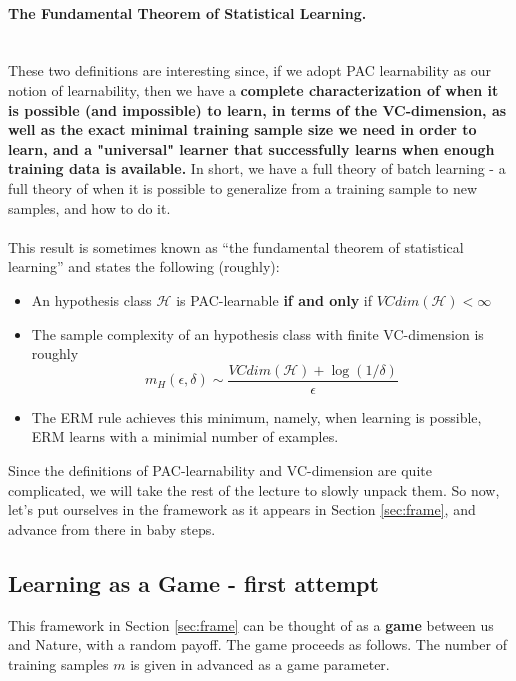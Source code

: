 \documentclass[11pt]{article}
\newcommand{\Hc}{\mathcal{H}}
\begin{document}
{\paragraph{The Fundamental Theorem of Statistical Learning.}
~\\
These two definitions are interesting since, if we adopt PAC learnability as our
notion of learnability, then we have a {\bf complete characterization of when it
is possible (and impossible) to learn, in terms of the VC-dimension, as well as  the exact minimal  training sample size we need in order to learn, and a "universal" learner that successfully learns when enough training data is available. } In short, we have a full theory of batch learning - a full theory of when it is possible to generalize from a training sample to new samples, and how to do it.
\\~\\
This result is sometimes known as ``the fundamental theorem of statistical
learning'' and states the following (roughly):
\begin{itemize}
  \item An hypothesis class $\Hc$ is PAC-learnable {\bf if and only} if
    $VCdim(\Hc)<\infty$
  \item The sample complexity of an hypothesis class with finite VC-dimension is
    roughly\[
m_H(\epsilon,\delta) \sim \frac{VCdim(\Hc)+\log(1/\delta)}{\epsilon}
\]
\item The ERM rule achieves this minimum, namely, when learning is possible, ERM
  learns with a minimial number of examples.
\end{itemize}

Since the definitions of PAC-learnability and VC-dimension are quite complicated, we will take the rest of the lecture to slowly unpack them. So now, let's put ourselves in the framework as it appears in Section \ref{sec:frame}, and advance from there in baby steps. 

\subsection{Learning as a Game - first attempt}

This framework in Section \ref{sec:frame} can be thought of as a {\bf game} between us and Nature, with a random payoff. The game proceeds as follows. The number of training samples $m$ is given in advanced as a game parameter. \\

}
\end{document}
